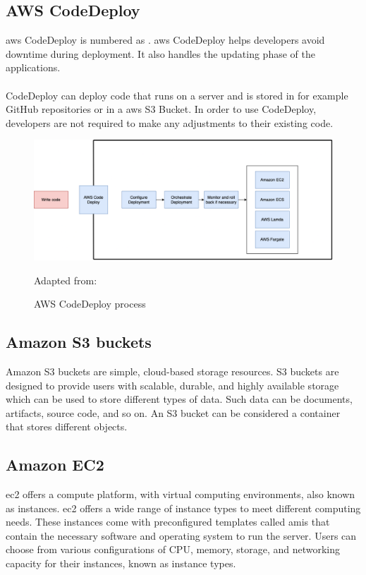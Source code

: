 \subsection{AWS CodeDeploy}
\acrshort{aws} CodeDeploy is numbered as  \cite{AWSCodeDeploy}.
\acrshort{aws} CodeDeploy helps developers avoid downtime during deployment. It also handles the updating phase of the applications. 
\\~\\
CodeDeploy can deploy code that runs on a server and is stored in for example GitHub repositories or in a \acrshort{aws} S3 Bucket. In order to use CodeDeploy, developers are not required to make any adjustments to their existing code. \cite{CodeDeploy1}

\begin{figure}[H]
    \centering
    \includegraphics[scale=0.4]{Images/AWSCodeDeploy.png}
    \caption{AWS CodeDeploy process} Adapted from: \cite{CodeDeploy1}
    \label{fig: AWS CodeDeploy Process}
\end{figure}


\subsection{Amazon S3 buckets}
Amazon S3 buckets are simple, cloud-based storage resources. S3 buckets are designed to provide users with scalable, durable, and highly available storage which can be used to store different types of data. Such data can be documents, \gls{artifact}s, source code, and so on. An S3 bucket can be considered a container that stores different objects. \cite{S3Bucket}

\subsection{Amazon EC2}
\acrlong{ec2} offers a \gls{compute platform}, with virtual computing environments, also known as instances. \acrshort{ec2} offers a wide range of instance types to meet different computing needs. These instances come with preconfigured templates called \acrlong{amis} that contain the necessary software and operating system to run the server. Users can choose from various configurations of CPU, memory, storage, and networking capacity for their instances, known as instance types. \cite{awsec2}